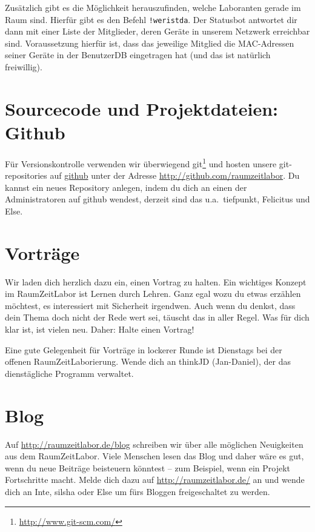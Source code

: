 \documentclass[12pt, DIV16, a4paper]{scrartcl}
\begin{document}
Zusätzlich gibt es die Möglichkeit herauszufinden, welche Laboranten gerade im
Raum sind. Hierfür gibt es den Befehl \texttt{!weristda}. Der Statusbot
antwortet dir dann mit einer Liste der Mitglieder, deren Geräte in unserem
Netzwerk erreichbar sind. Voraussetzung hierfür ist, dass das jeweilige
Mitglied die MAC-Adressen seiner Geräte in der BenutzerDB eingetragen hat (und
das ist natürlich freiwillig).

\section*{Sourcecode und Projektdateien: Github}

Für Versionskontrolle verwenden wir überwiegend
git\footnote{\url{http://www.git-scm.com/}} und hosten unsere git-repositories
auf \href{http://github.com/}{github} unter der Adresse
\url{http://github.com/raumzeitlabor}. Du kannst ein neues Repository anlegen,
indem du dich an einen der Administratoren auf github wendest, derzeit sind das
u.a.\ tiefpunkt, Felicitus und Else.

\section*{Vorträge}

Wir laden dich herzlich dazu ein, einen Vortrag zu halten. Ein wichtiges
Konzept im RaumZeitLabor ist Lernen durch Lehren. Ganz egal wozu du etwas
erzählen möchtest, es interessiert mit Sicherheit irgendwen. Auch wenn du
denkst, dass dein Thema doch nicht der Rede wert sei, täuscht das in aller
Regel. Was für dich klar ist, ist vielen neu. Daher: Halte einen Vortrag!
\np

Eine gute Gelegenheit für Vorträge in lockerer Runde ist Dienstags bei der
offenen RaumZeitLaborierung. Wende dich an thinkJD (Jan-Daniel), der das
dienstägliche Programm verwaltet.

\section*{Blog}

Auf \url{http://raumzeitlabor.de/blog} schreiben wir über alle möglichen
Neuigkeiten aus dem RaumZeitLabor. Viele Menschen lesen das Blog und daher wäre
es gut, wenn du neue Beiträge beisteuern könntest -- zum Beispiel, wenn ein
Projekt Fortschritte macht. Melde dich dazu auf \url{http://raumzeitlabor.de/}
an und wende dich an Inte, silsha oder Else um fürs Bloggen freigeschaltet zu
werden.
\end{document}
